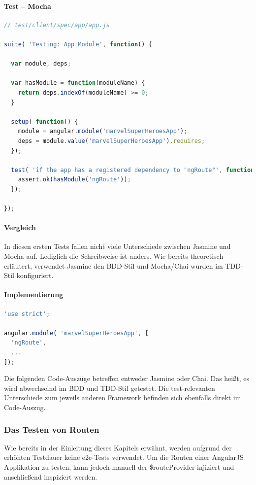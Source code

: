 \paragraph{Test -- Mocha}
\begin{lstlisting}[language=JavaScript, caption=TDD AngularJS - Dependencies - Mocha]
// test/client/spec/app/app.js

suite( 'Testing: App Module', function() {

  var module, deps;

  var hasModule = function(moduleName) {
    return deps.indexOf(moduleName) >= 0;
  }

  setup( function() {
    module = angular.module('marvelSuperHeroesApp');
    deps = module.value('marvelSuperHeroesApp').requires;
  });

  test( 'if the app has a registered dependency to "ngRoute"', function() {
    assert.ok(hasModule('ngRoute'));
  });

});
\end{lstlisting}

\paragraph{Vergleich}
In diesen ersten Tests fallen nicht viele Unterschiede zwischen Jasmine und Mocha auf. Lediglich die Schreibweise ist anders. Wie bereits theoretisch erläutert, verwendet Jasmine den BDD-Stil und Mocha/Chai wurden im TDD-Stil konfiguriert.

\paragraph{Implementierung}
\begin{lstlisting}[language=JavaScript, caption=TDD AngularJS - Dependencies - Implementierung]
'use strict';

angular.module( 'marvelSuperHeroesApp', [
  'ngRoute',
  ...
]);
\end{lstlisting}

Die folgenden Code-Auszüge betreffen entweder Jasmine oder Chai. Das heißt, es wird abwechselnd im BDD und TDD-Stil getestet. Die test-relevanten Unterschiede zum jeweils anderen Framework befinden sich ebenfalls direkt im Code-Auszug.

\newpage
\subsubsection{Das Testen von Routen}
Wie bereits in der Einleitung dieses Kapitels erwähnt, werden aufgrund der erhöhten Testdauer keine e2e-Tests verwendet. Um die Routen einer AngularJS Applikation zu testen, kann jedoch manuell der \$routeProvider injiziert und anschließend inspiziert werden.

